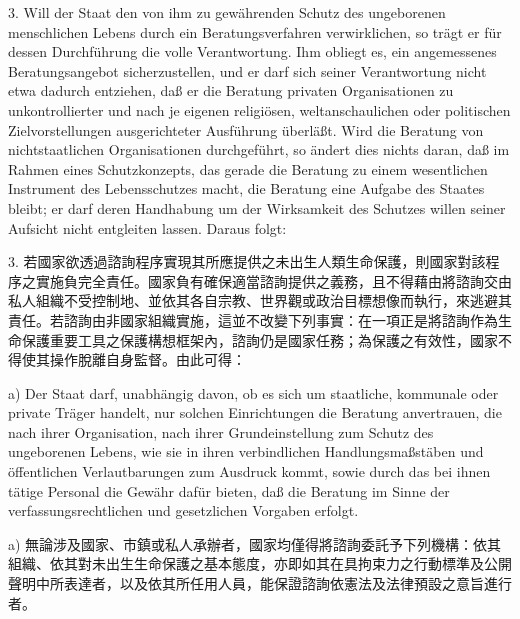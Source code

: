 \documentclass[12pt]{article}
\begin{document}
\begin{sourcepara}[title={原文D.123}]
3. Will der Staat den von ihm zu gewährenden Schutz des ungeborenen menschlichen Lebens durch ein Beratungsverfahren verwirklichen, so trägt er für dessen Durchführung die volle Verantwortung. Ihm obliegt es, ein angemessenes Beratungsangebot sicherzustellen, und er darf sich seiner Verantwortung nicht etwa dadurch entziehen, daß er die Beratung privaten Organisationen zu unkontrollierter und nach je eigenen religiösen, weltanschaulichen oder politischen Zielvorstellungen ausgerichteter Ausführung überläßt. Wird die Beratung von nichtstaatlichen Organisationen durchgeführt, so ändert dies nichts daran, daß im Rahmen eines Schutzkonzepts, das gerade die Beratung zu einem wesentlichen Instrument des Lebensschutzes macht, die Beratung eine Aufgabe des Staates bleibt; er darf deren Handhabung um der Wirksamkeit des Schutzes willen seiner Aufsicht nicht entgleiten lassen. Daraus folgt:
\end{sourcepara}
\begin{transpara}
3. 若國家欲透過諮詢程序實現其所應提供之未出生人類生命保護，則國家對該程序之實施負完全責任。國家負有確保適當諮詢提供之義務，且不得藉由將諮詢交由私人組織不受控制地、並依其各自宗教、世界觀或政治目標想像而執行，來逃避其責任。若諮詢由非國家組織實施，這並不改變下列事實：在一項正是將諮詢作為生命保護重要工具之保護構想框架內，諮詢仍是國家任務；為保護之有效性，國家不得使其操作脫離自身監督。由此可得：
\end{transpara}

\begin{sourcepara}[title={原文D.124}]
a) Der Staat darf, unabhängig davon, ob es sich um staatliche, kommunale oder private Träger handelt, nur solchen Einrichtungen die Beratung anvertrauen, die nach ihrer Organisation, nach ihrer Grundeinstellung zum Schutz des ungeborenen Lebens, wie sie in ihren verbindlichen Handlungsmaßstäben und öffentlichen Verlautbarungen zum Ausdruck kommt, sowie durch das bei ihnen tätige Personal die Gewähr dafür bieten, daß die Beratung im Sinne der verfassungsrechtlichen und gesetzlichen Vorgaben erfolgt.
\end{sourcepara}
\begin{transpara}
a) 無論涉及國家、市鎮或私人承辦者，國家均僅得將諮詢委託予下列機構：依其組織、依其對未出生生命保護之基本態度，亦即如其在具拘束力之行動標準及公開聲明中所表達者，以及依其所任用人員，能保證諮詢依憲法及法律預設之意旨進行者。
\end{transpara}
\end{document}
